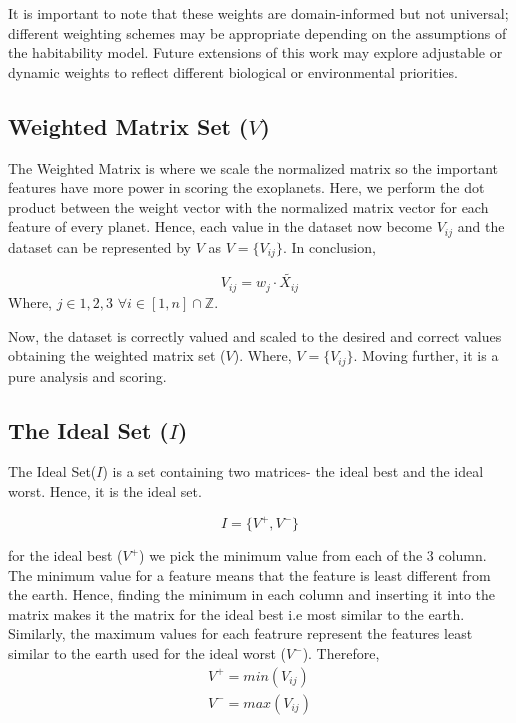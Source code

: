 \documentclass[12pt]{article}
\begin{document}
It is important to note that these weights are domain-informed but not universal; different weighting schemes may be appropriate depending on the assumptions of the habitability model. Future extensions of this work may explore adjustable or dynamic weights to reflect different biological or environmental priorities.

\subsection{ Weighted Matrix Set ($V$)}\label{subsec: weighted matrix}
The Weighted Matrix is where we scale the normalized matrix so the important features have more power in scoring the exoplanets. Here, we perform the dot product between the weight vector with the normalized matrix vector for each feature of every planet. Hence, each value in the dataset now become $V_{ij}$ and the dataset can be represented by $V$ as $V=\{V_{ij}\}$. In conclusion,

\begin{equation}
    V_{ij} = w_{j} \cdot \tilde{X_{ij}}
\end{equation}
Where, \quad $j \in 1,2,3$ \quad $\forall i \in [1,n] \cap \mathbb{Z} $.\vspace{1em}

Now, the dataset is correctly valued and scaled to the desired and correct values obtaining the weighted matrix set ($V$). Where, $V=\{V_{ij}\}$. Moving further, it is a pure analysis and scoring.

\subsection{The Ideal Set ($I$)\label{subsec: ideal set}}
The Ideal Set($I$) is a set containing two matrices- the ideal best and the ideal worst. Hence, it is the ideal set.

\begin{equation*}
    I=\{V^{+} , V^{-}\}
\end{equation*}\vspace{0.5em}

for the ideal best ($V^{+}$) we pick the minimum value from each of the 3 column. The minimum value for a feature means that the feature is least different from the earth. Hence, finding the minimum in each column and inserting it into the matrix makes it the matrix for the ideal best i.e most similar to the earth. Similarly, the maximum values for each featrure represent the features least similar to the earth used for the ideal worst ($V^-$). Therefore,\vspace{0.5em}
    \begin{align}
        V^{+} = min(V_{ij})\\[1em]
        V^{-} = max(V_{ij})
     \end{align}\vspace{0.5em}
\end{document}

